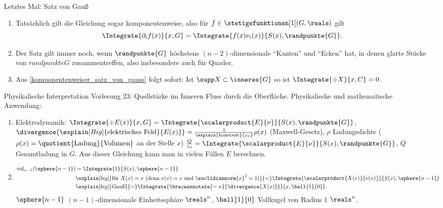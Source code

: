 Letztes Mal: Satz von Gauß
\begin{bemerkungen*}
  \begin{enumerate}[label=\rechtsklammer{\arabic*}, ref=Bemerkung \rechtsklammer{\arabic*}]
    \item \label{komponentenweiser_satz_von_gauss}Tatsächlich gilt die Gleichung sogar komponentenweise, also für \( f\in \stetigefunktionen[1](G,\reals) \) gilt
    \begin{equation*}
      \Integrate{\partial_i f(x)}{x,G}=\Integrate{f(x) \nu_i(x)}{S(x),\randpunkte{G}}.
    \end{equation*}
    \item Der Satz gilt immer noch, wenn \( \randpunkte{G} \) höchstens \( (n-2) \)-dimensionale \enquote{Kanten} und \enquote{Ecken} hat, in denen glatte Stücke von \( randpunkte{G} \) zusammentreffen, also insbesondere auch für Quader.
    \item Aus \ref{komponentenweiser_satz_von_gauss} folgt sofort: Ist \( \supp X\subset \inneres{G} \) so ist \( \Integrate{\div X}{x,C}=0 \).
  \end{enumerate}
\end{bemerkungen*}
Physikalische Interpretation \tto Vorlesung 23: Quellstärke im Inneren \teq Fluss durch die Oberfläche. Physikalische und mathematische Anwendung:
\begin{beispiele}
  \begin{enumerate}
    \item Elektrodynamik: \( \Integrate{\div E(x)}{x,G} =\Integrate{\scalarproduct{E}{\nu}}{S(x),\randpunkte{G}} \), \( \divergence{\explain[Big]{\text{elektrisches Feld}}{E(x)}}=\frac{1}{\explain{\text{konstant}}{\varepsilon_0}}\rho(x) \) (Maxwell-Gesetz), \( \rho \) Ladungsdichte (\( \rho(x) =\quotient{\text{Ladung}}{\text{Volumen}}\) an der Stelle \( x \)) \timplies \( \frac{Q}{\varepsilon_0}=\Integrate{\scalarproduct{E}{\nu}}{S(x),\randpunkte{G}} \), \( Q \) \teq Gesamtladung in \( G \). Aus dieser Gleichung kann man in vielen Fällen \( E \) berechnen.
    \item \begin{align*}
      \operatorname{vol}_{n-1}(\sphere{n-1})&=\Integrate{1}{S(x),\sphere{n-1}}\\
      &\explain[big]{\text{für \( X(x)=x \) (denn \( \nu(x)=x \) und \( \euclidiannorm{x}^2=1 \))}}{=}\Integrate{\scalarproduct{X(x)}{\nu(x)}}{S(x),\sphere{n-1}}\\
      &\explain[big]{\text{Gauß}}{=}\Integrate{\braceannotate{=n}{\divergence{X(x)}}}{x,\ball{1}{0}}.
    \end{align*}
    \( \sphere{n-1} \) \( (n-1) \)-dimensionale Einheitssphäre \tsubset \( \reals^n \), \( \ball{1}{0} \) Vollkugel von Radius \( 1 \) \tsubset \( \reals^n \).
  \end{enumerate}
\end{beispiele}
